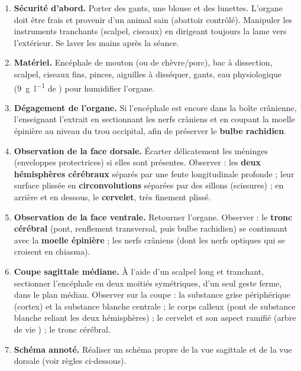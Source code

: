 \documentclass[11pt]{article}
\begin{document}
\begin{methode}
\begin{enumerate}
\item \textbf{Sécurité d'abord.} Porter des gants, une blouse et des lunettes. L'organe doit être frais et provenir d'un animal sain (abattoir contrôlé). Manipuler les instruments tranchants (scalpel, ciseaux) en dirigeant toujours la lame vers l'extérieur. Se laver les mains après la séance.
\item \textbf{Matériel.} Encéphale de mouton (ou de chèvre/porc), bac à dissection, scalpel, ciseaux fins, pinces, aiguilles à disséquer, gants, eau physiologique (\SI{9}{\g\per\litre} de ) pour humidifier l'organe.
\item \textbf{Dégagement de l'organe.} Si l'encéphale est encore dans la boîte crânienne, l'enseignant l'extrait en sectionnant les nerfs crâniens et en coupant la moelle épinière au niveau du trou occipital, afin de préserver le \textbf{bulbe rachidien}.
\item \textbf{Observation de la face dorsale.} Écarter délicatement les méninges (enveloppes protectrices) si elles sont présentes. Observer : les \textbf{deux hémisphères cérébraux} séparés par une fente longitudinale profonde ; leur surface plissée en \textbf{circonvolutions} séparées par des sillons (scissures) ; en arrière et en dessous, le \textbf{cervelet}, très finement plissé.
\item \textbf{Observation de la face ventrale.} Retourner l'organe. Observer : le \textbf{tronc cérébral} (pont, renflement transversal, puis bulbe rachidien) se continuant avec la \textbf{moelle épinière} ; les nerfs crâniens (dont les nerfs optiques qui se croisent en chiasma).
\item \textbf{Coupe sagittale médiane.} À l'aide d'un scalpel long et tranchant, sectionner l'encéphale en deux moitiés symétriques, d'un seul geste ferme, dans le plan médian. Observer sur la coupe : la substance grise périphérique (cortex) et la substance blanche centrale ; le corps calleux (pont de substance blanche reliant les deux hémisphères) ; le cervelet et son aspect ramifié (\og arbre de vie \fg) ; le tronc cérébral.
\item \textbf{Schéma annoté.} Réaliser un schéma propre de la vue sagittale et de la vue dorsale (voir règles ci-dessous).
\end{enumerate}
\end{methode}
\end{document}
